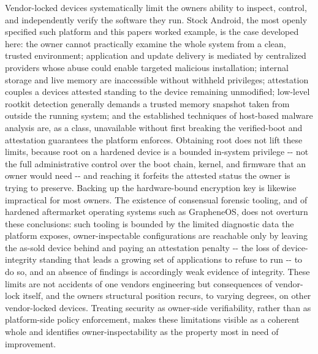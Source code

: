 \documentclass[
]{article}
\begin{document}
Vendor-locked devices systematically limit the owner\textquotesingle s
ability to inspect, control, and independently verify the software they
run. Stock Android, the most openly specified such platform and this
paper\textquotesingle s worked example, is the case developed here: the
owner cannot practically examine the whole system from a clean, trusted
environment; application and update delivery is mediated by centralized
providers whose abuse could enable targeted malicious installation;
internal storage and live memory are inaccessible without withheld
privileges; attestation couples a device\textquotesingle s attested
standing to the device remaining unmodified; low-level rootkit detection
generally demands a trusted memory snapshot taken from outside the
running system; and the established techniques of host-based malware
analysis are, as a class, unavailable without first breaking the
verified-boot and attestation guarantees the platform enforces.
Obtaining root does not lift these limits, because root on a hardened
device is a bounded in-system privilege -\/- not the full administrative
control over the boot chain, kernel, and firmware that an owner would
need -\/- and reaching it forfeits the attested status the owner is
trying to preserve. Backing up the hardware-bound encryption key is
likewise impractical for most owners. The existence of consensual
forensic tooling, and of hardened aftermarket operating systems such as
GrapheneOS, does not overturn these conclusions: such tooling is bounded
by the limited diagnostic data the platform exposes, owner-inspectable
configurations are reachable only by leaving the as-sold device behind
and paying an attestation penalty -\/- the loss of device-integrity
standing that leads a growing set of applications to refuse to run -\/-
to do so, and an absence of findings is accordingly weak evidence of
integrity. These limits are not accidents of one
vendor\textquotesingle s engineering but consequences of vendor-lock
itself, and the owner\textquotesingle s structural position recurs, to
varying degrees, on other vendor-locked devices. Treating security as
owner-side verifiability, rather than as platform-side policy
enforcement, makes these limitations visible as a coherent whole and
identifies owner-inspectability as the property most in need of
improvement.

  
\end{document}
